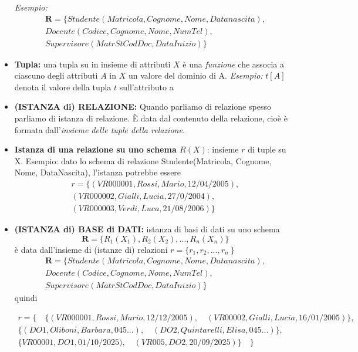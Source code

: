 \documentclass{article}
\begin{document}
\begin{itemize}
    \textit{Esempio:} 
    \begin{align*}
        \boldsymbol{R} = \{ Studente(Matricola, Cognome, Nome, Datanascita),\\
        Docente(Codice, Cognome, Nome, NumTel), \\ Supervisore(MatrSt CodDoc, DataInizio)\}
    \end{align*}
    \item \textbf{Tupla:} una tupla su in insieme di attributi $X$ è una \textit{funzione} che associa a ciascuno degli attributi $A$ in $X$ un valore del dominio di A. \textit{Esempio:} $t[A]$ denota il valore della tupla $t$ sull'attributo a
    \item \textbf{(ISTANZA di) RELAZIONE:} \small Quando parliamo di relazione spesso parliamo di istanza di relazione. \normalsize È data dal contenuto della relazione, cioè è formata dall'\textit{insieme delle tuple della relazione.}
    \item \textbf{Istanza di una relazione su uno schema $R(X)$}: insieme $r$ di tuple su X.
    Esempio: dato lo schema di relazione Studente(Matricola, Cognome, Nome, DataNascita), l'istanza potrebbe essere \begin{align*}
        r = \{(VR000001, Rossi, Mario, 12/04/2005), \\(VR000002, Gialli, Lucia, 27/0/2004),\\ (VR000003, Verdi, Luca, 21/08/2006)\}
    \end{align*}
    \item \textbf{(ISTANZA di) BASE di DATI:} istanza di basi di dati su uno schema \begin{equation*}
        \boldsymbol{R}= \{  R_1(X_1), R_2(X_2), ..., R_n(X_n) \}
    \end{equation*} è data dall'insieme di (istanze di) relazioni $r = 
\{ r_1, r_2, ..., r_n\ \}$
 \begin{align*}
        \boldsymbol{R} = \{ Studente(Matricola, Cognome, Nome, Datanascita), \\ Docente(Codice, Cognome, Nome, NumTel), \\ Supervisore(MatrSt CodDoc, DataInizio)\}
    \end{align*}
    quindi
    
    \begin{align*}
        r = \{ \quad \{(VR000001, Rossi, Mario, 12/12/2005), \quad (VR00002, Gialli, Lucia, 16/01/2005)\},\quad \\ \{(DO1, Oliboni, Barbara, 045 ...), \quad (DO2, Quintarelli, Elisa, 045 ...)\},\quad \\ \{VR00001, DO1, 01/10/2025), \quad (VR005, DO2, 20/09/2025)\} \quad \}
    \end{align*}
    

\end{itemize}
\end{document}

